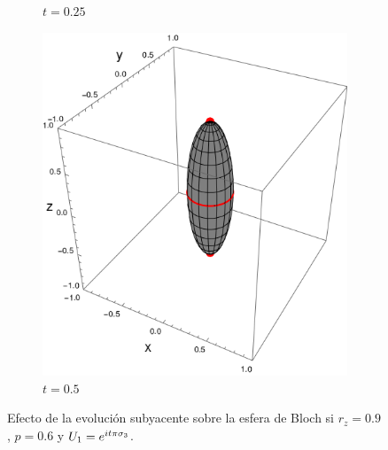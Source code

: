 \begin{figure}[h!]
\begin{subfigure}{0.32\textwidth}
      \caption{$t=0.25$}
    \end{subfigure}
    \begin{subfigure}{0.32\textwidth}
      \centering
      \includegraphics[width=0.9\linewidth]{maxent/figures/U1xU2_H1=Pi(sz)_H2=Id_z=0.9_p=0.6t=0.5.png}
      \caption{$t=0.5$}
    \end{subfigure}
    \caption{Efecto de la evolución subyacente sobre la esfera de Bloch si $r_{z}=0.9$, $p=0.6$ y $U_{1}=e^{it\pi \sigma_{3}}$.}
    \label{fig:FaseChangeSequence}
\end{figure}

